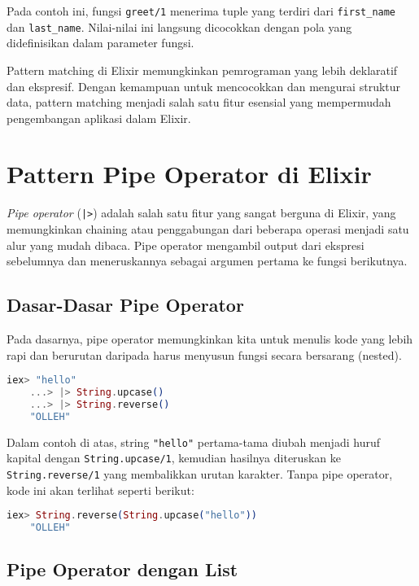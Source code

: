 Pada contoh ini, fungsi \texttt{greet/1} menerima tuple yang terdiri dari \texttt{first\_name} dan \texttt{last\_name}. Nilai-nilai ini langsung dicocokkan dengan pola yang didefinisikan dalam parameter fungsi.

Pattern matching di Elixir memungkinkan pemrograman yang lebih deklaratif dan ekspresif. Dengan kemampuan untuk mencocokkan dan mengurai struktur data, pattern matching menjadi salah satu fitur esensial yang mempermudah pengembangan aplikasi dalam Elixir.



\section{Pattern Pipe Operator di Elixir}

\textit{Pipe operator} (\texttt{|>}) adalah salah satu fitur yang sangat berguna di Elixir, yang memungkinkan chaining atau penggabungan dari beberapa operasi menjadi satu alur yang mudah dibaca. Pipe operator mengambil output dari ekspresi sebelumnya dan meneruskannya sebagai argumen pertama ke fungsi berikutnya.

\subsection{Dasar-Dasar Pipe Operator}

Pada dasarnya, pipe operator memungkinkan kita untuk menulis kode yang lebih rapi dan berurutan daripada harus menyusun fungsi secara bersarang (nested).

\begin{lstlisting}[language=Elixir]
	iex> "hello"
	...> |> String.upcase()
	...> |> String.reverse()
	"OLLEH"
\end{lstlisting}

Dalam contoh di atas, string \texttt{"hello"} pertama-tama diubah menjadi huruf kapital dengan \texttt{String.upcase/1}, kemudian hasilnya diteruskan ke \texttt{String.reverse/1} yang membalikkan urutan karakter. Tanpa pipe operator, kode ini akan terlihat seperti berikut:

\begin{lstlisting}[language=Elixir]
	iex> String.reverse(String.upcase("hello"))
	"OLLEH"
\end{lstlisting}

\subsection{Pipe Operator dengan List}

